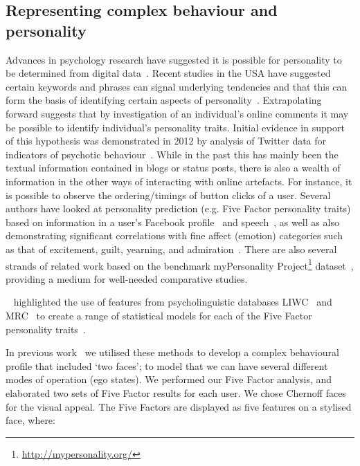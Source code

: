 \documentclass[letterpaper]{article}
\begin{document}
\subsection{Representing complex behaviour and personality}

Advances in psychology research have suggested it is possible for
personality to be determined from digital
data~\cite{pennebaker+king:1999,vazire+gosling:2004,iacobelli-et-al:2011}.
Recent studies in the USA have suggested certain keywords and phrases
can signal underlying tendencies and that this can form the basis of
identifying certain aspects of
personality~\cite{woodworth-et-al:2012}.  Extrapolating forward
suggests that by investigation of an individual's online comments it
may be possible to identify individual's personality traits. Initial
evidence in support of this hypothesis was demonstrated in 2012 by
analysis of Twitter data for indicators of psychotic
behaviour~\cite{sumner-et-al:2012}. While in the past this has mainly
been the textual information contained in blogs or status posts, there
is also a wealth of information in the other ways of interacting with
online artefacts. For instance, it is possible to observe the
ordering/timings of button clicks of a user. Several authors have
looked at personality prediction (e.g. Five Factor personality traits)
based on information in a user's Facebook
profile~\cite{back-et-al:2010,golbeck-et-al:2001} and
speech~\cite{chung+pennebaker:2007,tausczik+pennebaker:2010}, as well
as also demonstrating significant correlations with fine affect
(emotion) categories such as that of excitement, guilt, yearning, and
admiration~\cite{mohammad+kiritchenko:2013}. There are also several
strands of related work based on the benchmark myPersonality
Project\footnote{\url{http://mypersonality.org/}}
dataset~\cite{celli-et-al:2013}, providing a medium for well-needed
comparative studies.

\citeauthor{mairesse-et-al:2007}~
highlighted the use of features from psycholinguistic databases
LIWC~\cite{pennebaker-et-al:2001} and MRC~\cite{wilson:1988} to create
a range of statistical models for each of the Five Factor personality
traits~\cite{norman:1963,peabody+goldberg:1989}.

In previous work~\cite{oatley+crick:2014} we utilised these methods to
develop a complex behavioural profile that included `two faces'; to
model that we can have several different modes of operation (ego
states). We performed our Five Factor analysis, and elaborated two
sets of Five Factor results for each user. We chose Chernoff
faces~\cite{chernoff:1973} for the visual appeal. The Five Factors are displayed as five
features on a stylised face, where:
\end{document}
